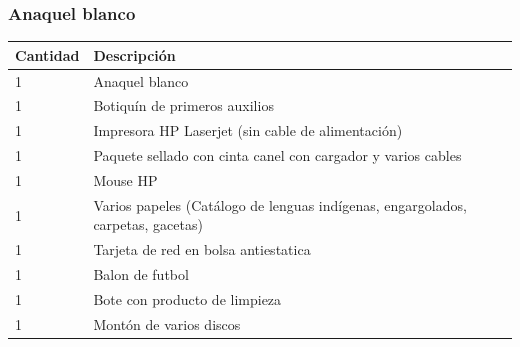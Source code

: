 \documentclass[a4paper,11pt]{article}                 %
\begin{document}
  \subsubsection*{Anaquel blanco}
    \begin{longtable}{|p{}|p{}|}
    \hline
    Cantidad & Descripción                                                                     \\ \hline
    1        & Anaquel blanco                                                                  \\ \hline
    1        & Botiquín de primeros auxilios                                                   \\ \hline
    1        & Impresora HP Laserjet (sin cable de alimentación)                               \\ \hline
    1        & Paquete sellado con cinta canel con cargador y varios cables                    \\ \hline
    1        & Mouse HP                                                                        \\ \hline
    1        & Varios papeles (Catálogo de lenguas indígenas, engargolados, carpetas, gacetas) \\ \hline
    1        & Tarjeta de red en bolsa antiestatica                                            \\ \hline
    1        & Balon de futbol                                                                 \\ \hline  
    1        & Bote con producto de limpieza                                                   \\ \hline  
    1        & Montón de varios discos                                                         \\ \hline
    \end{longtable} 
\end{document}

